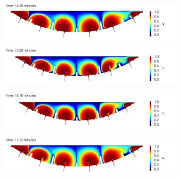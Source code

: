             \begin{figure}
                \centering
                \begin{subfigure}{\textwidth}
                    \includegraphics[width=\textwidth]{diagrams/results-contractions/placenta-moving-mesh/mm-placenta-transport.0000.png}
                    \caption{}
                    \label{fig:moving-mesh-placenta-transport:1}
                \end{subfigure}
                \begin{subfigure}{\textwidth}
                    \includegraphics[width=\textwidth]{diagrams/results-contractions/placenta-moving-mesh/mm-placenta-transport.0025.png}
                    \caption{}
                    \label{fig:moving-mesh-placenta-transport:2}
                \end{subfigure}
                \begin{subfigure}{\textwidth}
                    \includegraphics[width=\textwidth]{diagrams/results-contractions/placenta-moving-mesh/mm-placenta-transport.0050.png}
                    \caption{}
                    \label{fig:moving-mesh-placenta-transport:3}
                \end{subfigure}
                \begin{subfigure}{\textwidth}
                    \includegraphics[width=\textwidth]{diagrams/results-contractions/placenta-moving-mesh/mm-placenta-transport.0095.png}

\end{subfigure}
\end{figure}
